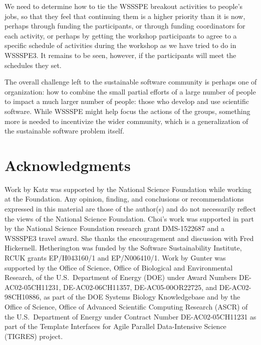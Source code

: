 \documentclass[11pt, oneside]{amsart}
\newcommand{\todo}[1]{{\color{blue}$\blacksquare$~\textsf{[TODO: #1]}}}
\begin{document}
We need to determine how to tie the WSSSPE breakout activities to people's jobs,
so that they feel that continuing them is a higher priority than it is now,
perhaps through funding the participants, or through funding coordinators for
each activity, or perhaps by getting the workshop participants to agree to a
specific schedule of activities during the workshop as we have tried to do in
WSSSPE3. It remains to be seen, however, if the participants will meet the
schedules they set.

The overall challenge left to the sustainable software community is perhaps one
of organization: how to combine the small partial efforts of a large number of
people to impact a much larger number of people: those who develop and use
scientific software. While WSSSPE might help focus the actions of the groups,
something more is needed to incentivize the wider community, which is a
generalization of the sustainable software problem itself.


\section*{Acknowledgments} \label{sec:acks}

Work by Katz was supported by the National Science Foundation while working at
the Foundation. Any opinion, finding, and conclusions or recommendations
expressed in this material are those of the author(s) and do not necessarily
reflect the views of the National Science Foundation.
%
Choi's work was supported in part by the National Science Foundation research
grant DMS-1522687 and a WSSSPE3 travel award. She thanks the encouragement and
discussion with Fred Hickernell.
%
Hetherington was funded by the Software Sustainability Institute, RCUK grants
EP/H043160/1 and EP/N006410/1.
%
Work by Gunter was supported by the Office of Science, Office of Biological and
Environmental Research, of the U.S.\ Department of Energy (DOE) under Award
Numbers DE-AC02-05CH11231, DE-AC02-06CH11357, DE-AC05-00OR22725, and
DE-AC02-98CH10886, as part of the DOE Systems Biology Knowledgebase and by the
Office of Science, Office of Advanced Scientific Computing Research (ASCR) of
the U.S.\ Department of Energy under Contract Number DE-AC02-05CH11231 as part
of the Template Interfaces for Agile Parallel Data-Intensive Science (TIGRES)
project.
%

\appendix
\end{document}
